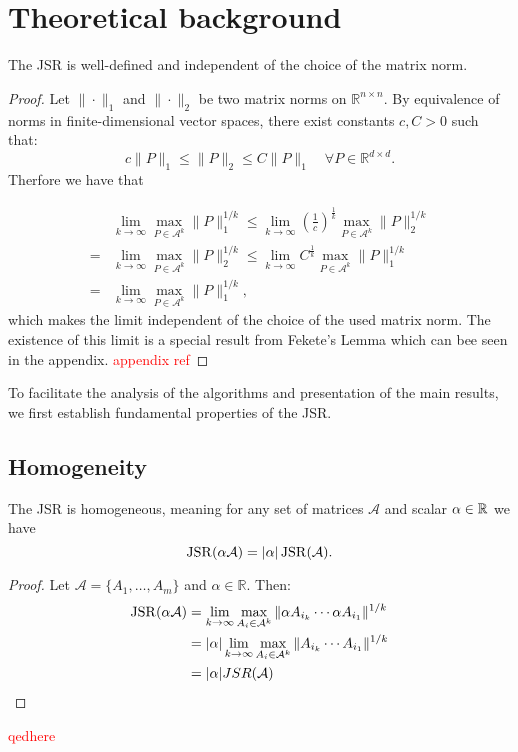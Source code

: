 \section{Theoretical background}

\begin{theorem}
    The JSR is well-defined and independent of the choice of the matrix norm.
\end{theorem}

\begin{proof}
Let $\| \cdot \|_1$   and $ \| \cdot \|_2 $ be two matrix norms on $ \mathbb{R}^{n \times n} $. By equivalence of norms in finite-dimensional vector spaces, there exist constants $ c, C > 0 $ such that:
$$
c \|P\|_1 \leq \|P\|_2 \leq C \|P\|_1 \quad \forall P \in \mathbb{R}^{d \times d}
.$$
Therfore we have that

\begin{align*}
& \lim_{k \to \infty} \max_{P \in \mathcal{A}^k} \|P\|_{1}^{1/k} 
\le  \lim_{k \to \infty} {(\frac{1}{c})}^{\frac{1}{k}} \max_{P \in \mathcal{A}^k} \|P\|_{2}^{1/k} \\
= & \lim_{k \to \infty} \max_{P \in \mathcal{A}^k} \|P\|_{2}^{1/k} 
\le  \lim_{k \to \infty} {C}^{\frac{1}{k}} \max_{P \in \mathcal{A}^k} \|P\|_{1}^{1/k}\\
= & \lim_{k \to \infty} \max_{P \in \mathcal{A}^k} \|P\|_{1}^{1/k},
\end{align*}
which makes the limit independent of the choice of the used matrix norm. 
The existence of this limit is a special result from Fekete's Lemma which can bee seen in the appendix. \textcolor{red}{appendix ref} 
\end{proof}

To facilitate the analysis of the algorithms and presentation of the main results, we first establish fundamental properties of the JSR.

\subsection*{Homogeneity}
\begin{proposition}
    The JSR is homogeneous, meaning for any set of matrices $\mathcal{A}$ and scalar $\alpha \in \mathbb{R}$ we have
    \begin{equation}
        \operatorname{JSR}(\alpha \mathcal{A}) = |\alpha| \operatorname{JSR}(\mathcal{A}).
    \end{equation}
\end{proposition}
\begin{proof}
    Let $\mathcal{A} = \{A_1, \dots, A_m\}$ and $\alpha \in \mathbb{R}$. Then:
    \begin{align*}
        \operatorname{JSR}(\alpha \mathcal{A}) & = \lim_{k \to \infty} \max_{A_{i} \in \mathcal{A}^k} \|\alpha A_{i_k} \cdots \alpha A_{i_1}\|^{1/k} \\
        & = |\alpha| \lim_{k \to \infty} \max_{A_{i} \in \mathcal{A}^k} \|A_{i_k} \cdots A_{i_1}\|^{1/k} \\
        & = |\alpha| JSR(\mathcal{A}) \\
    \end{align*}
\end{proof}
\textcolor{red}{qedhere}

